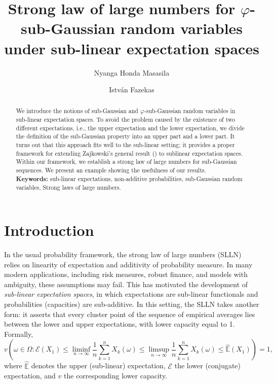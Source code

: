 \documentclass[12pt]{article}
\title{Strong law of large numbers for $\varphi$-sub-Gaussian random variables under sub-linear expectation spaces}
\author[1,*]{Nyanga Honda Masasila}
\author[2]{Istv\'an Fazekas}
\affil[1]{Doctoral School of Informatics, University of Debrecen, Hungary}
\affil[2]{Faculty of Informatics, University of Debrecen, Hungary}
\date{}
\theoremstyle{definition}
\theoremstyle{remark}
\numberwithin{equation}{section}
\def\Eh{{\hat{\mathbb{E}}}}
\def\ED{{\mathcal E}}
\begin{document}
\maketitle

\begin{abstract}
We introduce the notions of sub-Gaussian and $\varphi$-sub-Gaussian random variables in sub-linear expectation spaces.
To avoid the problem caused by the existence of two different expectations, i.e., 
the upper expectation and the lower expectation,
we divide the definition of the sub-Gaussian property into an upper part and a lower part.
It turns out that this approach fits well to the sub-linear setting; it provides a proper framework for extending Zajkowski's general result (\cite{Zajkowski2021}) to sublinear expectation spaces. 
Within our framework, we establish a strong law of large numbers for sub-Gaussian sequences. 
We present an example showing the usefulness of our results. \\


\textbf{Keywords:} sub-linear expectations, non-additive probabilities, sub-Gaussian random variables, Strong laws of large numbers.
\end{abstract}

\section{Introduction}

 In the usual probability framework, the strong law of large numbers (SLLN) relies on linearity of expectation and additivity of probability measure. In many modern applications, including risk measures, robust finance, and models with ambiguity, these assumptions may fail.
This has motivated the development of \emph{sub-linear expectation spaces}, 
in which expectations are sub-linear functionals and probabilities (capacities) are sub-additive.
In this setting, the SLLN takes another form: 
it asserts that every cluster point of the sequence of empirical averages lies between the lower and upper expectations,
 with lower capacity equal to 1. 
 Formally,
\begin{equation}
\label{slln}
  v\!\left(\omega\in \Omega :\ED(X_1) \le\liminf_{n \to \infty} \frac{1}{n} \sum_{k=1}^n X_k(\omega) \le 
  \limsup_{n \to \infty} \frac{1}{n} \sum_{k=1}^n X_k(\omega) \le \Eh(X_1) \right) = 1,  
\end{equation}
where $\Eh$ denotes the upper (sub-linear) expectation, $\ED$ the lower (conjugate) expectation, 
and $v$ the corresponding lower capacity. 
\end{document}

